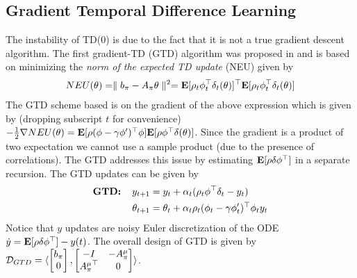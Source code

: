 \subsection{Gradient Temporal Difference Learning}
The instability of TD($0$) is due to the fact that it is not a true gradient descent algorithm. The first gradient-TD (GTD) algorithm was proposed in \cite{gtdref} and is based on minimizing the \emph{norm of the expected TD update} (NEU) given by
\begin{align}\label{neu}
NEU(\theta)=\parallel b_\pi -A_\pi\theta\parallel^2
=\mathbf{E}[\rho_t\phi_t^\top\delta_t(\theta)]^\top\mathbf{E}[\rho_t\phi_t^\top\delta_t(\theta)]
\end{align}
The GTD scheme based is on the gradient of the above expression which is given by (dropping subscript $t$ for convenience) $-\frac{1}{2}\nabla NEU(\theta)=\mathbf{E}[\rho (\phi-\gamma\phi')^\top \phi]\mathbf{E}[\rho \phi^\top\delta(\theta)]$. Since the gradient is a product of two expectation we cannot use a sample product (due to the presence of correlations). The GTD addresses this issue by estimating $\mathbf{E}[\rho\delta\phi^\top]$ in a separate recursion. The GTD updates can be given by
\begin{align}
\begin{split}
\textbf{GTD:\quad}y_{t+1}&=y_t+\alpha_t(\rho_t\phi^\top\delta_t -y_t)\\
\theta_{t+1}&=\theta_t+\alpha_t\rho_t(\phi_t-\gamma\phi'_t)^\top\phi_ty_t
\end{split}
\end{align}
Notice that $y$ updates are noisy Euler discretization of the ODE $\dot{y}=\mathbf{E}[\rho\delta\phi^\top]-y(t)$. The overall design of GTD is given by $\mathcal{D}_{GTD}=\langle \begin{bmatrix}b_\pi\\ 0\\ \end{bmatrix},\begin{bmatrix}-I &-A^\mu_\pi \\ {A^\mu_\pi}^\top &0 \\ \end{bmatrix}\rangle$.\par
